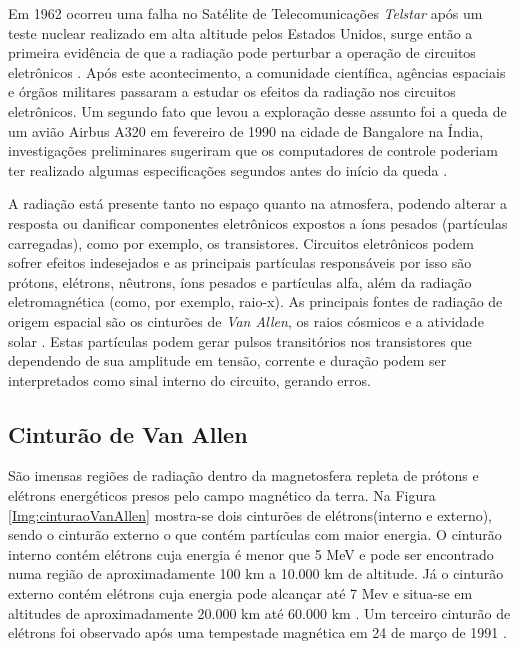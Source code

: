 Em 1962 ocorreu uma falha no Satélite de Telecomunicações \textit{Telstar} após um teste nuclear realizado em alta altitude pelos Estados Unidos, surge então a primeira evidência de que a radiação pode perturbar a operação de circuitos eletrônicos \cite{Velazco:2007}. Após este acontecimento, a comunidade científica, agências espaciais e órgãos militares passaram a estudar os efeitos da radiação nos circuitos eletrônicos. Um segundo fato que levou a exploração desse assunto foi a queda de um avião Airbus A320 em fevereiro de 1990 na cidade de Bangalore na Índia, investigações preliminares sugeriram que os computadores de controle poderiam ter realizado algumas especificações segundos antes do início da queda \cite{LaprieAcidente:1990}.

A radiação está presente tanto no espaço quanto na atmosfera, podendo alterar a resposta ou danificar componentes eletrônicos expostos a íons pesados (partículas carregadas), como por exemplo, os transistores. Circuitos eletrônicos podem sofrer efeitos indesejados e as principais partículas responsáveis por isso são prótons, elétrons, nêutrons, íons pesados e partículas alfa, além da radiação eletromagnética (como, por exemplo, raio-x). As principais fontes de radiação de origem espacial são os cinturões de \textit{Van Allen}, os raios cósmicos \cite{Stassinopoulos:1988} e a atividade solar \cite{Boudenot:2007}. Estas partículas podem gerar pulsos transitórios nos transistores que dependendo de sua amplitude em tensão, corrente e duração podem ser interpretados como sinal interno do circuito, gerando erros. 


\subsection{Cinturão de Van Allen} \label{subsec: cinturao}

São imensas regiões de radiação dentro da magnetosfera repleta de prótons e elétrons energéticos presos pelo campo magnético da terra. Na Figura \ref{Img:cinturaoVanAllen} mostra-se dois cinturões de elétrons(interno e externo), sendo o cinturão externo o que contém partículas com maior energia. O cinturão interno contém elétrons cuja energia é menor que 5 MeV e pode ser encontrado numa região de aproximadamente 100 km a 10.000 km de altitude. Já o cinturão externo contém elétrons cuja energia pode alcançar até 7 Mev e situa-se em altitudes de aproximadamente 20.000 km até 60.000 km \cite{Stassinopoulos:1988}. Um terceiro cinturão de elétrons foi observado após uma tempestade magnética em 24 de março de 1991 \cite{Velazco:2007}.      

